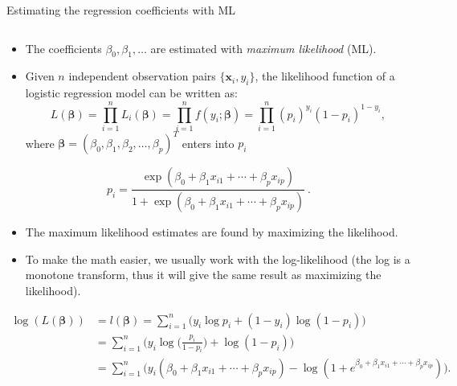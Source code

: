 \documentclass[10pt,ignorenonframetext,]{beamer}
\providecommand{\tightlist}{%
  \setlength{\itemsep}{0pt}\setlength{\parskip}{0pt}}
\begin{document}
\begin{frame}

\begin{block}{Estimating the regression coefficients with ML}

\(~\)

\begin{itemize}
\tightlist
\item
  The coefficients \(\beta_0, \beta_1, \ldots\) are estimated with
  \emph{maximum likelihood} (ML).
\end{itemize}

\vspace{2mm}

\begin{itemize}
\tightlist
\item
  Given \(n\) independent observation pairs
  \(\{{\boldsymbol x}_i, y_i\}\), the likelihood function of a logistic
  regression model can be written as:
  \[L(\boldsymbol{\beta}) = \prod_{i=1}^n L_i(\boldsymbol{\beta}) = \prod_{i=1}^n f(y_i; \boldsymbol{\beta}) = \prod_{i=1}^n (p_i)^{y_i}(1-p_i)^{1-y_i},\]
  where
  \(\boldsymbol{\beta} = (\beta_0, \beta_1, \beta_2, \ldots, \beta_p)^T\)
  enters into \(p_i\)
\end{itemize}

\[p_i= \frac{\exp(\beta_0+\beta_1 x_{i1}+\cdots + \beta_p x_{ip})}{1 + \exp(\beta_0 + \beta_1 x_{i1}+\cdots+\beta_p x_{ip})} \ .\]

\end{block}

\end{frame}

\begin{frame}

\begin{itemize}
\item
  The maximum likelihood estimates are found by maximizing the
  likelihood.
\item
  To make the math easier, we usually work with the log-likelihood (the
  log is a monotone transform, thus it will give the same result as
  maximizing the likelihood).
\end{itemize}

\vspace{-4mm}

\begin{align*} \log(L(\boldsymbol{\beta}))&=l(\boldsymbol{\beta}) =\sum_{i=1}^n \Big ( y_i \log p_i + (1-y_i) \log(1 - p_i )\Big ) \\ &= \sum_{i=1}^n \Big ( y_i \log \Big (\frac{p_i}{1-p_i} \Big) + \log(1-p_i) \Big ) \\
&= \sum_{i=1}^n \Big (y_i (\beta_0 + \beta_1 x_{i1}+\cdots + \beta_p x_{ip}) - \log(1 + e^{\beta_0 + \beta_1 x_{i1}+\cdots + \beta_p x_{ip}} ) \Big ).\end{align*}

\end{frame}
\end{document}
